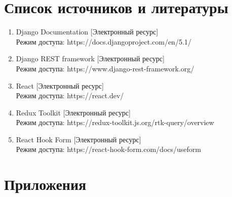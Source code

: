\documentclass[a4paper,14pt]{extarticle}
\begin{document}
\section{Список источников и литературы}
\begin{enumerate}
    \item Django Documentation [Электронный ресурс] \\Режим доступа: https://docs.djangoproject.com/en/5.1/
    \item Django REST framework [Электронный ресурс] \\Режим доступа: https://www.django-rest-framework.org/
    \item React [Электронный ресурс] \\Режим доступа: https://react.dev/
    \item Redux Toolkit [Электронный ресурс] \\Режим доступа: https://redux-toolkit.js.org/rtk-query/overview
    \item React Hook Form [Электронный ресурс] \\Режим доступа: https://react-hook-form.com/docs/useform
\end{enumerate}

\iffalse
\section{Приложения}
\end{document}
